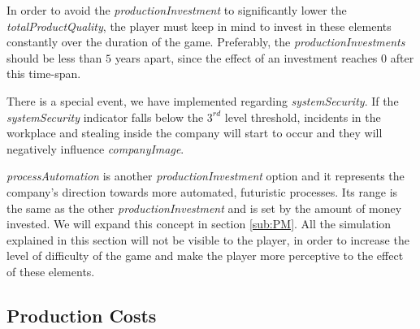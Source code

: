 \begin{figure}[ht]
\centering
{}
	\label{fig:InvestmentGraph}
\end{figure}


In order to avoid the \textit{productionInvestment} to significantly lower the \textit{totalProductQuality}, the player must keep in mind to invest in these elements constantly over the duration of the game. Preferably, the \textit{productionInvestments} should be less than $5$ years apart, since the effect of an investment reaches $0$ after this time-span.

There is a special event, we have implemented regarding \textit{systemSecurity}.
If the \textit{systemSecurity} indicator falls below the $3^{rd}$ level threshold, incidents in the workplace and stealing inside the company will start to occur and they will negatively influence \textit{companyImage}. 

\textit{processAutomation} is another \textit{productionInvestment} option and it represents the company's direction towards more automated, futuristic processes. Its range is the same as the other \textit{productionInvestment} and is set by the amount of money invested. We will expand this concept in section \ref{sub:PM}.
All the simulation explained in this section will not be visible to the player, in order to increase the level of difficulty of the game and make the player more perceptive to the effect of these elements. 


\subsection{Production Costs}
\label{prodCosts_simulation}

